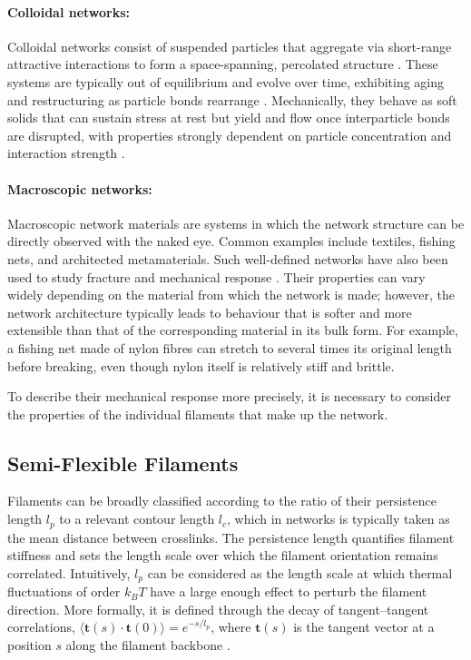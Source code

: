 \paragraph{Colloidal networks:}
Colloidal networks consist of suspended particles that aggregate via short-range attractive interactions to form a space-spanning, percolated structure \cite{Mewis2011,nabizadeh_network_2024,Chen2020,zhang_correlated_2019}. These systems are typically out of equilibrium and evolve over time, exhibiting aging and restructuring as particle bonds rearrange \cite{viasnoffHowAreColloidal2003,renouYieldingProcessesColloidal2010,manley_gravitational_2005}. Mechanically, they behave as soft solids that can sustain stress at rest but yield and flow once interparticle bonds are disrupted, with properties strongly dependent on particle concentration and interaction strength \cite{Mewis2011}.

\paragraph{Macroscopic networks:}
Macroscopic network materials are systems in which the network structure can be directly observed with the naked eye. Common examples include textiles, fishing nets, and architected metamaterials. Such well-defined networks have also been used to study fracture and mechanical response \cite{driscollRoleRigidityControlling2016}. Their properties can vary widely depending on the material from which the network is made; however, the network architecture typically leads to behaviour that is softer and more extensible than that of the corresponding material in its bulk form. For example, a fishing net made of nylon fibres can stretch to several times its original length before breaking, even though nylon itself is relatively stiff and brittle.

To describe their mechanical response more precisely, it is necessary to consider the properties of the individual filaments that make up the network.

\subsection{Semi-Flexible Filaments} \label{sec:SemiFlexible}

Filaments can be broadly classified according to the ratio of their persistence length \(l_p\) to a relevant contour length \(l_c\), which in networks is typically taken as the mean distance between crosslinks. The persistence length quantifies filament stiffness and sets the length scale over which the filament orientation remains correlated. Intuitively, $l_p$ can be considered as the length scale at which thermal fluctuations of order $k_BT$ have a large enough effect to perturb the filament direction. More formally, it is defined through the decay of tangent--tangent correlations, $\langle \bm{t}(s) \cdot \bm{t} (0) \rangle = e^{-s/l_p}$, where $\bm{t}(s)$ is the tangent vector at a position $s$ along the filament backbone \cite{doi_theory_1988}. 

